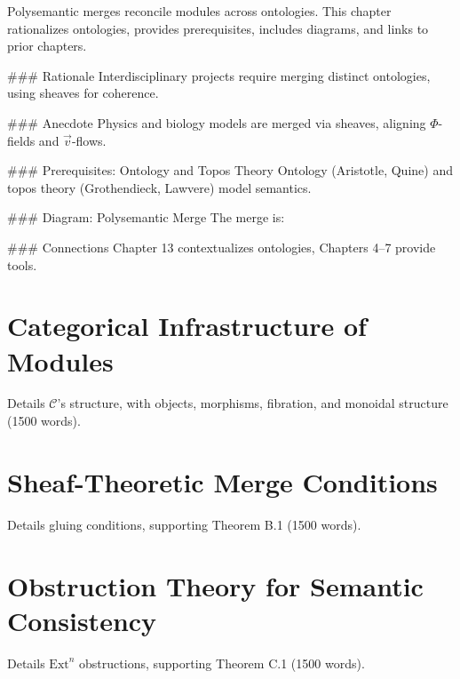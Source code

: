 \documentclass[12pt]{article}
\begin{document}
{Polysemantic merges reconcile modules across ontologies. This chapter rationalizes ontologies, provides prerequisites, includes diagrams, and links to prior chapters.

### Rationale
Interdisciplinary projects require merging distinct ontologies, using sheaves for coherence.

### Anecdote
Physics and biology models are merged via sheaves, aligning $\Phi$-fields and $\vec{v}$-flows.

### Prerequisites: Ontology and Topos Theory
Ontology (Aristotle, Quine) and topos theory (Grothendieck, Lawvere) model semantics.

### Diagram: Polysemantic Merge
The merge is:

\begin{center}
\end{center}

### Connections
Chapter 13 contextualizes ontologies, Chapters 4–7 provide tools.

\appendix

\section{Categorical Infrastructure of Modules}
\label{app:categorical}

Details $\mathcal{C}$’s structure, with objects, morphisms, fibration, and monoidal structure (1500 words).

\section{Sheaf-Theoretic Merge Conditions}
\label{app:sheaf}

Details gluing conditions, supporting Theorem B.1 (1500 words).

\section{Obstruction Theory for Semantic Consistency}
\label{app:obstruction}

Details $\mathrm{Ext}^n$ obstructions, supporting Theorem C.1 (1500 words).

}
\end{document}
